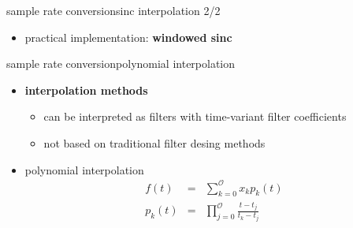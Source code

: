 	\begin{frame}{sample rate conversion}{sinc interpolation 2/2}
        \begin{itemize}
            \item   practical implementation: \textbf{windowed sinc}
        \end{itemize}
    \end{frame}
	\begin{frame}{sample rate conversion}{polynomial interpolation}
        \begin{itemize}
            \item   \textbf{interpolation methods }
                \begin{itemize}
                    \item   can be interpreted as filters with time-variant filter coefficients
                    \item   not based on traditional filter desing methods
                \end{itemize}
            \pause
            \item   polynomial interpolation
                \begin{eqnarray*}
                    f(t) &=& \sum\limits_{k=0}^\mathcal{O}x_k p_k(t)\\
                    p_k(t) &=& \prod\limits_{j=0}^\mathcal{O}\frac{t-t_j}{t_k-t_j}
                \end{eqnarray*}
        \end{itemize}
    \end{frame}
